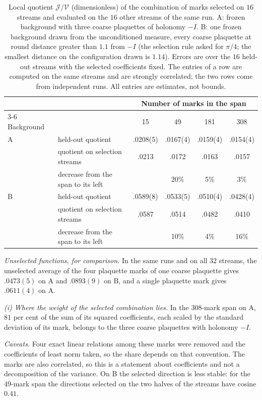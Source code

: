 \begin{table}[htbp]
\caption{Local quotient $\mathcal J/\mathcal V$ (dimensionless) of the combination of marks selected on $16$
streams and evaluated on the $16$ other streams of the same run. \textsf{A}: frozen background with three coarse
plaquettes of holonomy $-I$. \textsf{B}: one frozen background drawn from the unconditioned measure, every coarse
plaquette at round distance greater than $1.1$ from $-I$ (the selection rule asked for $\pi/4$; the smallest
distance on the configuration drawn is $1.14$). Errors are over the $16$ held-out streams with the
selected coefficients fixed. The entries of a row are computed on the same streams and are strongly
correlated; the two rows come from independent runs. All entries are estimates, not bounds.}\label{tab:local}
\centering\small
\begin{tabular}{@{}llcccc@{}}
\toprule
 & & \multicolumn{4}{c}{Number of marks in the span} \\
\cmidrule(l){3-6}
Background & & 15 & 49 & 181 & 308 \\
\midrule
\textsf{A} & held-out quotient  & .0208(5) & .0167(4) & .0159(4) & .0154(4) \\
  & quotient on selection streams & .0213 & .0172 & .0163 & .0157 \\
  & decrease from the span to its left &  & 20\% & 5\% & 3\% \\
\addlinespace
\textsf{B} & held-out quotient  & .0589(8) & .0533(5) & .0510(4) & .0428(4) \\
  & quotient on selection streams & .0587 & .0514 & .0482 & .0410 \\
  & decrease from the span to its left &  & 10\% & 4\% & 16\% \\
\bottomrule
\end{tabular}
\end{table}

\emph{Unselected functions, for comparison.} In the same runs and on all $32$ streams, the unselected average
of the four plaquette marks of one coarse plaquette gives $.0473(5)$ on \textsf{A} and $.0893(9)$ on \textsf{B}, and a single
plaquette mark gives $.0611(4)$ on \textsf{A}.

\emph{{\upshape(i)} Where the weight of the selected combination lies.} In the $308$-mark span on \textsf{A}, $81$ per cent of
the sum of its squared coefficients, each scaled by the standard deviation of its mark, belongs to the three
coarse plaquettes with holonomy $-I$.

\emph{Caveats.} Four exact linear relations among these marks were removed and the coefficients of least norm
taken, so the share depends on that convention. The marks are also correlated, so this is a statement about
coefficients and not a decomposition of the variance. On \textsf{B} the selected direction is less stable: for the
$49$-mark span the directions selected on the two halves of the streams have cosine $0.41$.

